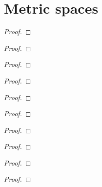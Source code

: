 \section{Metric spaces}
\begin{exercise}
\end{exercise}
\begin{proof}
\end{proof}

\begin{exercise}
\end{exercise}
\begin{proof}
\end{proof}

\begin{exercise}
\end{exercise}
\begin{proof}
\end{proof}

\begin{exercise}
\end{exercise}
\begin{proof}
\end{proof}

\begin{exercise}
\end{exercise}
\begin{proof}
\end{proof}

\begin{exercise}
\end{exercise}
\begin{proof}
\end{proof}

\begin{exercise}
\end{exercise}
\begin{proof}
\end{proof}

\begin{exercise}
\end{exercise}
\begin{proof}
\end{proof}

\begin{exercise}
\end{exercise}
\begin{proof}
\end{proof}

\begin{exercise}
\end{exercise}
\begin{proof}
\end{proof}

